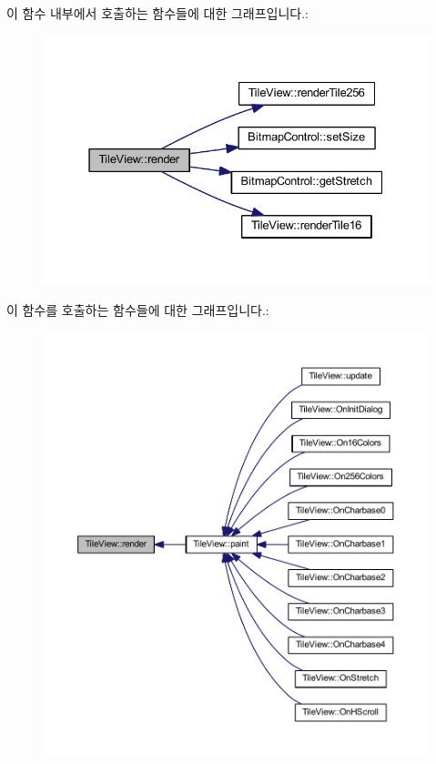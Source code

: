 이 함수 내부에서 호출하는 함수들에 대한 그래프입니다.\+:
\nopagebreak
\begin{figure}[H]
\begin{center}
\leavevmode
\includegraphics[width=331pt]{class_tile_view_a4b8f6e14f8ee7d4abea3a751cb5f7d74_cgraph}
\end{center}
\end{figure}
이 함수를 호출하는 함수들에 대한 그래프입니다.\+:
\nopagebreak
\begin{figure}[H]
\begin{center}
\leavevmode
\includegraphics[width=350pt]{class_tile_view_a4b8f6e14f8ee7d4abea3a751cb5f7d74_icgraph}
\end{center}
\end{figure}
\mbox{\label{class_tile_view_abc4f9051fc3c2bfad76a6b11787460f8}} 
